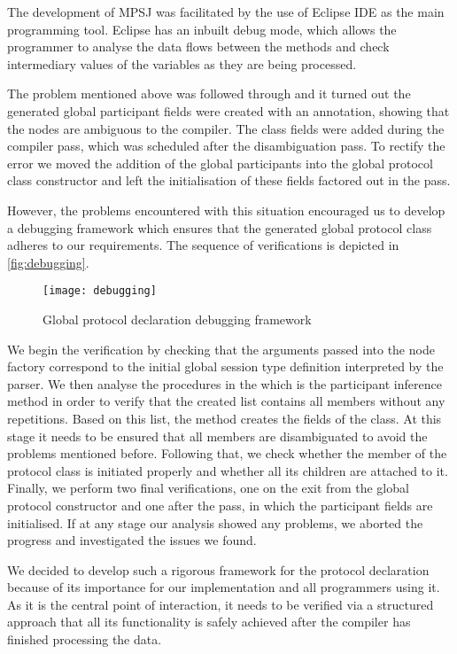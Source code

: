 The development of MPSJ was facilitated by the use of Eclipse IDE as the main programming tool. Eclipse has an inbuilt debug mode, which allows the programmer to analyse the data flows between the methods and check intermediary values of the variables as they are being processed.

The problem mentioned above was followed through and it turned out the generated global participant fields were created with an  annotation, showing that the nodes are ambiguous to the compiler. The class fields were added during the  compiler pass, which was scheduled after the disambiguation pass. To rectify the error we moved the addition of the global participants into the global protocol class constructor and left the initialisation of these fields factored out in the  pass.

However, the problems encountered with this situation encouraged us to develop a debugging framework which ensures that the generated global protocol class adheres to our requirements. The sequence of verifications is depicted in \autoref{fig:debugging}.

\begin{figure}[H]
\begin{center}
\texttt{[image: debugging]}
\caption{Global protocol declaration debugging framework}
\label{fig:debugging}
\end{center}
\end{figure}

We begin the verification by checking that the arguments passed into the node factory correspond to the initial global session type definition interpreted by the parser. We then analyse the procedures in the  which is the participant inference method in order to verify that the created list contains all members without any repetitions. Based on this list, the method  creates the fields of the class. At this stage it needs to be ensured that all members are disambiguated to avoid the problems mentioned before. Following that, we check whether the  member of the protocol class is initiated properly and whether all its children are attached to it. Finally, we perform two final verifications, one on the exit from the global protocol constructor and one after the  pass, in which the participant fields are initialised. If at any stage our analysis showed any problems, we aborted the progress and investigated the issues we found.

We decided to develop such a rigorous framework for the protocol declaration because of its importance for our implementation and all programmers using it. As it is the central point of interaction, it needs to be verified via a structured approach that all its functionality is safely achieved after the compiler has finished processing the data.
